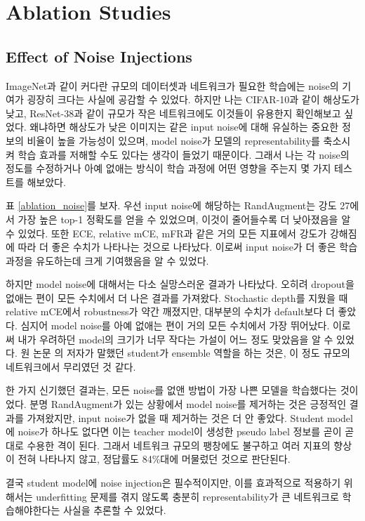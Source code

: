 \section{Ablation Studies}
\subsection{Effect of Noise Injections}
ImageNet과 같이 커다란 규모의 데이터셋과 네트워크가 필요한 학습에는 noise의 기여가 굉장히 크다는 사실에 공감할 수 있었다. \cite{xie2020selftraining} 하지만 나는 CIFAR-10과 같이 해상도가 낮고, ResNet-38과 같이 규모가 작은 네트워크에도 이것들이 유용한지 확인해보고 싶었다. 왜냐하면 해상도가 낮은 이미지는 같은 input noise에 대해 유실하는 중요한 정보의 비율이 높을 가능성이 있으며, model noise가 모델의 representability를 축소시켜 학습 효과를 저해할 수도 있다는 생각이 들었기 때문이다. 그래서 나는 각 noise의 정도를 수정하거나 아예 없애는 방식이 학습 과정에 어떤 영향을 주는지 몇 가지 테스트를 해보았다.

표 \ref{ablation_noise}를 보자. 우선 input noise에 해당하는 RandAugment는 강도 27에서 가장 높은 top-1 정확도를 얻을 수 있었으며, 이것이 줄어들수록 더 낮아졌음을 알 수 있었다. 또한 ECE, relative mCE, mFR과 같은 거의 모든 지표에서 강도가 강해짐에 따라 더 좋은 수치가 나타나는 것으로 나타났다. 이로써 input noise가 더 좋은 학습 과정을 유도하는데 크게 기여했음을 알 수 있었다.

하지만 model noise에 대해서는 다소 실망스러운 결과가 나타났다. 오히려 dropout을 없애는 편이 모든 수치에서 더 나은 결과를 가져왔다. Stochastic depth를 지웠을 때 relative mCE에서 robustness가 약간 깨졌지만, 대부분의 수치가 default보다 더 좋았다. 심지어 model noise를 아예 없애는 편이 거의 모든 수치에서 가장 뛰어났다. 이로써 내가 우려하던 model의 크기가 너무 작다는 가설이 어느 정도 맞았음을 알 수 있었다. 원 논문 \cite{xie2020selftraining}의 저자가 말했던 student가 ensemble 역할을 하는 것은, 이 정도 규모의 네트워크에서 무리였던 것 같다.

한 가지 신기했던 결과는, 모든 noise를 없앤 방법이 가장 나쁜 모델을 학습했다는 것이었다. 분명 RandAugment가 있는 상황에서 model noise를 제거하는 것은 긍정적인 결과를 가져왔지만, input noise가 없을 때 제거하는 것은 더 안 좋았다. Student model에 noise가 하나도 없다면 이는 teacher model이 생성한 pseudo label 정보를 곧이 곧대로 수용한 격이 된다. 그래서 네트워크 규모의 팽창에도 불구하고 여러 지표의 향상이 전혀 나타나지 않고, 정답률도 84\%대에 머물렀던 것으로 판단된다.

결국 student model에 noise injection은 필수적이지만, 이를 효과적으로 적용하기 위해서는 underfitting 문제를 겪지 않도록 충분히 representability가 큰 네트워크로 학습해야한다는 사실을 추론할 수 있었다.


